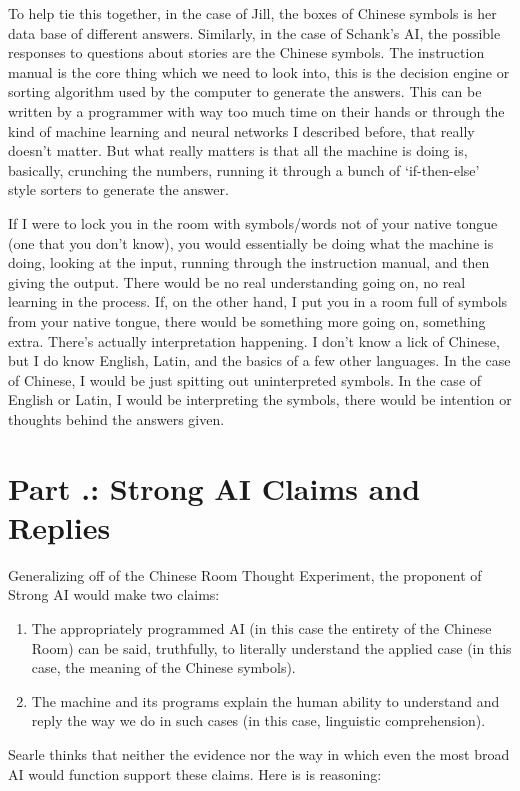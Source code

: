 To help tie this together, in the case of Jill, the boxes of Chinese symbols is her data base of different answers. Similarly, in the case of Schank's AI, the possible responses to questions about stories are the Chinese symbols. The instruction manual is the core thing which we need to look into, this is the decision engine or sorting algorithm used by the computer to generate the answers. This can be written by a programmer with way too much time on their hands or through the kind of machine learning and neural networks I described before, that really doesn't matter. But what really matters is that all the machine is doing is, basically, crunching the numbers, running it through a bunch of `if-then-else' style sorters to generate the answer.

If I were to lock you in the room with symbols/words not of your native tongue (one that you don't know), you would essentially be doing what the machine is doing, looking at the input, running through the instruction manual, and then giving the output. There would be no real understanding going on, no real learning in the process. If, on the other hand, I put you in a room full of symbols from your native tongue, there would be something more going on, something extra. There's actually interpretation happening. I don't know a lick of Chinese, but I do know English, Latin, and the basics of a few other languages. In the case of Chinese, I would be just spitting out uninterpreted symbols. In the case of English or Latin, I would be interpreting the symbols, there would be intention or thoughts behind the answers given.

\section{Part \thechapcount.\theseccount: Strong AI Claims and Replies}

Generalizing off of the Chinese Room Thought Experiment, the proponent of Strong AI would make two claims:
\begin{enumerate}
    \item The appropriately programmed AI (in this case the entirety of the Chinese Room) can be said, truthfully, to literally understand the applied case (in this case, the meaning of the Chinese symbols). 
    \item The machine and its programs explain the human ability to understand and reply the way we do in such cases (in this case, linguistic comprehension).
\end{enumerate}
Searle thinks that neither the evidence nor the way in which even the most broad AI would function support these claims. Here is is reasoning:


